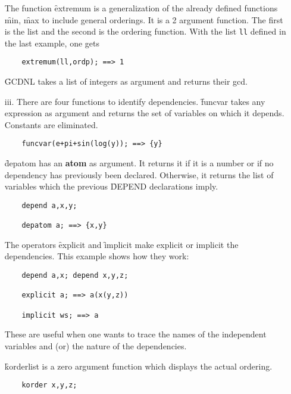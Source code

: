 \begin{itemize}
\hypertarget{operator:EXTREMUM}{}
The function \f{extremum} is a generalization of the already defined functions
\f{min}, \f{max} to include general orderings. It is a 2 argument function.
The first is the list and the second is the ordering function.
With the list \texttt{ll} defined in the last example, one gets
\begin{verbatim}
    extremum(ll,ordp); ==> 1
\end{verbatim}

\hypertarget{operator:GCDNL}{}
\f{GCDNL} takes a list of integers as argument and returns their gcd.  
\item[iii.] There are four functions to identify dependencies.
\hypertarget{operator:FUNCVAR}{}
\f{funcvar} takes any expression as argument and returns the set of
variables on which it depends. Constants are  eliminated.
\begin{verbatim}
    funcvar(e+pi+sin(log(y)); ==> {y}
\end{verbatim}
\hypertarget{operator:DEPATOM}{}
\f{depatom} has an \textbf{atom} as argument. It returns it if it is
a number or if no dependency has previously been declared. Otherwise,
it returns the list of variables which the previous \f{DEPEND} declarations
imply.
\begin{verbatim}
    depend a,x,y;

    depatom a; ==> {x,y}
\end{verbatim}
\hypertarget{operator:EXPLICIT}{}
\hypertarget{operator:IMPLICIT}{}
The operators \f{explicit} and \f{implicit} make explicit or
implicit the dependencies. This example shows how they work:
\begin{verbatim}
    depend a,x; depend x,y,z;

    explicit a; ==> a(x(y,z))

    implicit ws; ==> a
\end{verbatim}
These are useful when one wants to trace the names of the independent 
variables
and (or) the nature of the dependencies.

\hypertarget{operator:KORDERLIST}{}
\f{korderlist} is a zero argument function which displays the actual
ordering.
\begin{verbatim}
    korder x,y,z;


\end{verbatim}
\end{itemize}
